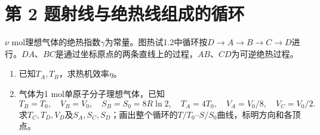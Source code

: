 \documentclass[UTF8,fontset=fandol,a4paper,11pt]{ctexart}
\begin{document}
\section*{第 2 题\quad 射线与绝热线组成的循环}\label{q:2}


$\nu$ mol理想气体的绝热指数$\gamma$为常量。图热试1.2中循环按$D\to A\to B\to C\to D$进行。$DA$、$BC$是通过坐标原点的两条直线上的过程，$AB$、$CD$为可逆绝热过程。
\begin{enumerate}
\item 已知$T_A,T_B$，求热机效率$\eta$。
\item 气体为1 mol单原子分子理想气体，已知
\[
T_B=T_0,\quad V_B=V_0,\quad S_B=S_0=8R\ln2,\quad
T_A=4T_0,\quad V_A=V_0/8,\quad V_C=V_0/2.
\]
求$T_C,T_D,V_D$及$S_A,S_C,S_D$；画出整个循环的$T/T_0$--$S/S_0$曲线，标明方向和各顶点。
\end{enumerate}
\end{document}
